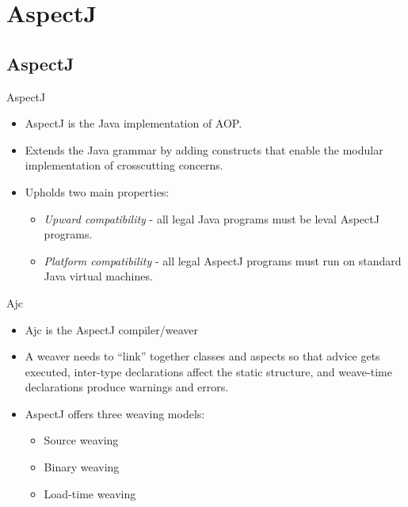 \documentclass[11pt]{beamer}
\begin{document}
\section{AspectJ}
\subsection*{AspectJ}

\begin{frame}{AspectJ}
  \begin{itemize}
    \item AspectJ is the Java implementation of AOP.
    \item Extends the Java grammar by adding constructs that enable the modular implementation of crosscutting concerns.
    \item Upholds two main properties:
    \begin{itemize}
    	\item \emph{Upward compatibility} - all legal Java programs must be leval AspectJ programs.
      	\item \emph{Platform compatibility} - all legal AspectJ programs must run on standard Java virtual machines.
     \end{itemize}
  \end{itemize}
\end{frame}

\begin{frame}{Ajc}
  \begin{itemize}
    \item Ajc is the AspectJ compiler/weaver
    \item A weaver needs to ``link'' together classes and aspects so that advice gets executed,
inter-type declarations affect the static structure, and weave-time declarations produce
warnings and errors.
    \item AspectJ offers three weaving models:
    \begin{itemize}
      \item Source weaving
      \item Binary weaving
      \item Load-time weaving
    \end{itemize}
  \end{itemize}
\end{frame}
\end{document}
